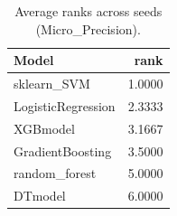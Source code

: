 \begin{table}[t]
\centering
\begin{tabular}{lr}
\toprule
Model & rank \\
\midrule
sklearn_SVM & 1.0000 \\
LogisticRegression & 2.3333 \\
XGBmodel & 3.1667 \\
GradientBoosting & 3.5000 \\
random_forest & 5.0000 \\
DTmodel & 6.0000 \\
\bottomrule
\end{tabular}
\caption{Average ranks across seeds (Micro_Precision).}
\label{tab:avg_rank_Micro_Precision}
\end{table}